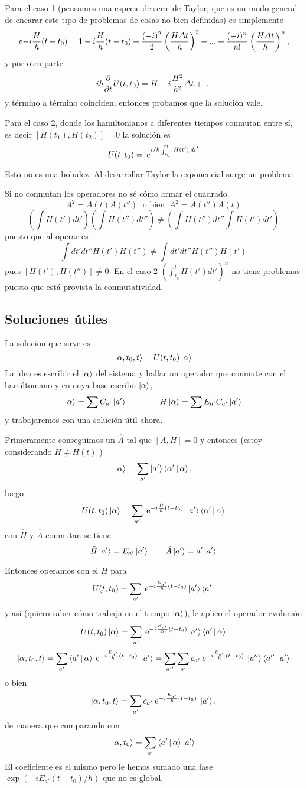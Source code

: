 \documentclass[10pt,oneside]{CBFT_book}
\begin{document}
Para el caso 1 (pensamos una especie de serie de Taylor, que es un modo general
de encarar este tipo de problemas de cosas no bien definidas) es simplemente 
\[
	\:\mathrm{e}{-i\frac{H}{\hbar}(t-t_0)} = 1 - i\frac{H}{\hbar}(t - t_0) + 
	\frac{(-i)^2}{2}\left( \frac{H \Delta t }{\hbar} \right)^2 + ... +
	\frac{(-i)^n}{n!} \left( \frac{ H\Delta t }{ \hbar } \right)^n,
\]
y por otra parte
\[
	i \hbar \frac{\partial^{\hspace{-0.05em}} {}}{\partial {t}^{\hspace{-0.05em}}}U(t,t_0) = H - i \frac{H^2}{\hbar^2} \Delta t + ...
\]
y término a término coinciden; entonces probamos que la solución vale.

Para el caso 2, donde los hamiltonianos a diferentes tiempos conmutan entre
sí, es decir $ [ H(t_1), H(t_2) ] = 0 $ la solución es
\[
	U(t,t_0) = \:\mathrm{e}^{ i/\hbar \int_{t_0}^t \: H(t') \: dt' }
\]

Esto no es una boludez. Al desarrollar Taylor la exponencial surge un problema

Si no conmutan los operadores no sé cómo armar el cuadrado.
\[
	A^2 = A(t)A(t'') \; \text{ o bien } \: A^2 = A(t'')A(t)
\]
\[
	\left( \int H(t') dt' \right)\left( \int H(t'') dt'' \right) \neq 
	\left( \int H(t'') dt'' \int H(t') dt' \right)
\]
puesto que al operar es 
\[
	\int dt' dt'' H(t')H(t'') \neq \int dt' dt'' H(t'') H(t') 
\]
pues $[H(t'),H(t'')]\neq 0$.
En el caso 2 $(\int_{t_0}^t H(t')dt' )^n$ no tiene problemas puesto que está 
provista la conmutatividad.

\subsection{Soluciones útiles}

La solucion que sirve es
\[
	\Ket{\alpha,t_0,t} = U(t,t_0)\Ket{\alpha}
\]
La idea es escribir el $\Ket{\alpha}$ del sistema y hallar un operador que conmute
con el hamiltoniano y en cuya base escribo $\Ket{\alpha}$,
\[
	\Ket{\alpha} = \sum C_{a'} \Ket{a'}
	\qquad \qquad 
	H \Ket{\alpha} = \sum E_{a'} C_{a'} \Ket{a'}
\]
y trabajaremos con una solución útil ahora.

Primeramente conseguimos un $\hat{A}$ tal que $[ A, H ]=0$ y entonces (estoy 
considerando $ H \neq H(t)$ )
\[
	\Ket{\alpha} = \sum_{a'} \Ket{a'}\Braket{\alpha'|\alpha},
\]
luego 
\[
	U(t,t_0)\Ket{\alpha} = \sum_{a'} \:\mathrm{e}^{-i\frac{\hat{H}}{\hbar}(t-t_0)}
	\: \Ket{a'}\Braket{\alpha'|\alpha}
\]
con $\hat{H}$ y $\hat{A}$ conmutan se tiene
\[
	\hat{H}\Ket{a'}=E_{a'}\Ket{a'} \qquad \hat{A}\Ket{a'}= a'\Ket{a'}
\]

Entonces operamos con el $H$ para 
\[
	U(t,t_0) = \sum_{a'} \:\mathrm{e}^{-i\frac{E_{a'}}{\hbar}(t-t_0)}\Ket{a'}\Bra{a'}
\]
y así (quiero saber cómo trabaja en el tiempo $\Ket{\alpha}$), le aplico el operador
evolución
\[
	U(t,t_0)\Ket{\alpha} = \sum_{a'} 
	\:\mathrm{e}^{-i\frac{E_{a'}}{\hbar}(t-t_0)}\Ket{a'}\Braket{a'|\alpha}
\]
\[
	\Ket{\alpha,t_0,t} = \sum_{a'} \Braket{a'|\alpha}
	\:\mathrm{e}^{-i\frac{E_{a'}}{\hbar}(t-t_0)} \: \Ket{a'} =
	\sum_{a''} \sum_{a'} c_{a'} \:\mathrm{e}^{-i\frac{E_{a'}}{\hbar}(t-t_0)} \: 
	\Ket{a''}\Braket{a''|a'}
\]
o bien
\[
	\Ket{\alpha,t_0,t} = \sum_{a'} 
	c_{a'} \:\mathrm{e}^{-i\frac{E_{a'}}{\hbar}(t-t_0)} \: \Ket{a'},
\]
de manera que comparando con 
\[
	\Ket{\alpha,t_0} = \sum_{a'} \Braket{a'|\alpha} \Ket{a'}
\]
El coeficiente es el mismo pero le hemos sumado una fase 
$\exp(-iE_{a'}(t-t_0)/\hbar)$ que no es global.
\end{document}
